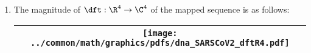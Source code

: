 \begin{example}
\begin{enumerate}
  \item \label{item:dftSARS-CoV-2_R4}
    The magnitude of $\dft:\R^4\to\C^4$ of the mapped sequence is as follows:
    \\\begin{tabular}{|>{\scs}c|}
         \hline
         \texttt{[image: ../common/math/graphics/pdfs/dna\_SARSCoV2\_dftR4.pdf]}%
       \\\hline
    \end{tabular}

\end{enumerate}
\end{example}


